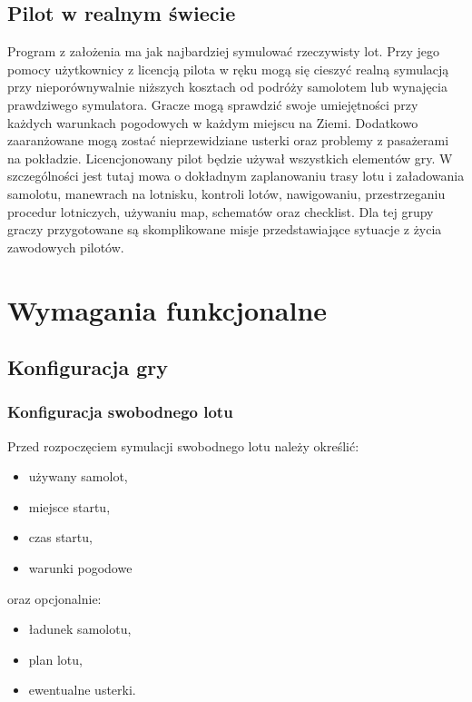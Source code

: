 \documentclass{mwrep}
\begin{document}
\section{Pilot w realnym świecie}

Program z założenia ma jak najbardziej symulować rzeczywisty lot. Przy jego pomocy użytkownicy z licencją pilota w ręku mogą się cieszyć realną symulacją przy nieporównywalnie niższych kosztach od podróży samolotem lub wynajęcia prawdziwego symulatora. Gracze mogą sprawdzić swoje umiejętności przy każdych warunkach pogodowych w każdym miejscu na Ziemi. Dodatkowo zaaranżowane mogą zostać nieprzewidziane usterki oraz problemy z pasażerami na pokładzie. Licencjonowany pilot będzie używał wszystkich elementów gry. W szczególności jest tutaj mowa o dokładnym zaplanowaniu trasy lotu i załadowania samolotu, manewrach na lotnisku, kontroli lotów, nawigowaniu, przestrzeganiu procedur lotniczych, używaniu map, schematów oraz checklist. Dla tej grupy graczy przygotowane są skomplikowane misje przedstawiające sytuacje z życia zawodowych pilotów.

\chapter{Wymagania funkcjonalne}

\section{Konfiguracja gry}

\subsection{Konfiguracja swobodnego lotu}

Przed rozpoczęciem symulacji swobodnego lotu należy określić:
\begin{itemize}
\item używany samolot,
\item miejsce startu,
\item czas startu,
\item warunki pogodowe
\end{itemize}
oraz opcjonalnie:
\begin{itemize}
\item ładunek samolotu,
\item plan lotu,
\item ewentualne usterki.
\end{itemize}
\end{document}
